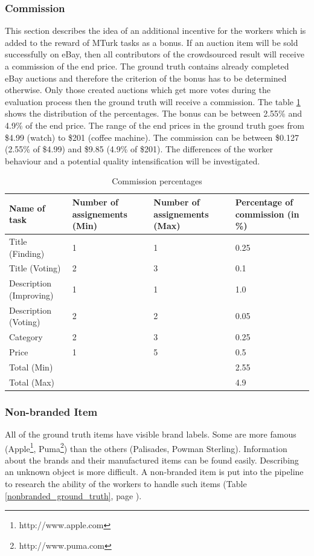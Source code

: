 \subsubsection{Commission}
This section describes the idea of an additional incentive for the workers which is added to the reward of MTurk tasks as a bonus. If an auction item will be sold successfully on eBay, then all contributors of the crowdsourced result will receive a commission of the end price. The ground truth contains already completed eBay auctions and therefore the criterion of the bonus has to be determined otherwise. Only those created auctions which get more votes during the evaluation process then the ground truth will receive a commission. The table \ref{comm_perc} shows the distribution of the percentages. The bonus can be between 2.55\% and 4.9\% of the end price. The range of the end prices in the ground truth goes from \$4.99 (watch) to \$201 (coffee machine). The commission can be between \$0.127 (2.55\% of \$4.99) and \$9.85 (4.9\% of \$201). The differences of the worker behaviour and a potential quality intensification will be investigated. 
\begin{table}[h!]
	\begin{center}
	\begin{tabular}{| p{3.25cm} | p{3.25cm} | p{3.25cm} | p{3.25cm} |}
		\hline
		\textbf{Name of task} & \textbf{Number of assignements (Min)} & \textbf{Number of assignements (Max)} & \textbf{Percentage of commission (in \%)} \\
		\hline
		Title (Finding) & 1 & 1 & 0.25 \\
		\hline
		Title (Voting) & 2 & 3 & 0.1 \\
		\hline
		Description (Improving) & 1 & 1 & 1.0 \\
		\hline
		Description (Voting) & 2 & 2 & 0.05 \\
		\hline
		Category & 2 & 3 & 0.25 \\
		\hline
		Price & 1 & 5 & 0.5 \\
		\hline
		Total (Min) & & & 2.55 \\
		\hline
		Total (Max) & & & 4.9 \\
		\hline
	\end{tabular}
	\end{center}
	\caption{Commission percentages}
	\label{comm_perc}
\end{table}

\subsubsection{Non-branded Item}
All of the ground truth items have visible brand labels. Some are more famous (Apple\footnote{http://www.apple.com}, Puma\footnote{http://www.puma.com}) than the others (Palisades, Powman Sterling). Information about the brands and their manufactured items can be found easily. Describing an unknown object is more difficult. A non-branded item is put into the pipeline to research the ability of the workers to handle such items (Table \ref{nonbranded_ground_truth}, page \pageref{nonbranded_ground_truth}). 

